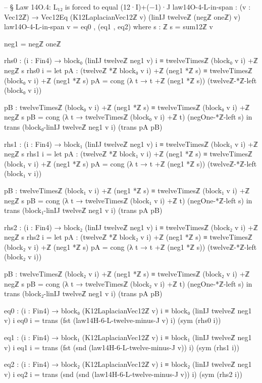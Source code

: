 \documentclass[11pt,a4paper]{book}
\begin{document}
\begin{code}
-- § Law 14O.4: L₁₂ is forced to equal (12·I)+(−1)·J
law14O-4-L-in-span : (v : Vec12ℤ) → Vec12Eq (K12LaplacianVec12ℤ v) (linIJ twelveℤ (negℤ oneℤ) v)
law14O-4-L-in-span v = eq0 , (eq1 , eq2)
  where
    s : ℤ
    s = sum12ℤ v

    neg1 = negℤ oneℤ

    rhs0 : (i : Fin4) →
      block₀ (linIJ twelveℤ neg1 v) i ≡ twelveTimesℤ (block₀ v i) +ℤ negℤ s
    rhs0 i =
      let
        pA : (twelveℤ *ℤ block₀ v i) +ℤ (neg1 *ℤ s) ≡ twelveTimesℤ (block₀ v i) +ℤ (neg1 *ℤ s)
        pA = cong (λ t → t +ℤ (neg1 *ℤ s)) (twelveℤ-*ℤ-left (block₀ v i))

        pB : twelveTimesℤ (block₀ v i) +ℤ (neg1 *ℤ s) ≡ twelveTimesℤ (block₀ v i) +ℤ negℤ s
        pB = cong (λ t → twelveTimesℤ (block₀ v i) +ℤ t) (negOne-*ℤ-left s)
      in
      trans
        (block₀-linIJ twelveℤ neg1 v i)
        (trans pA pB)

    rhs1 : (i : Fin4) →
      block₁ (linIJ twelveℤ neg1 v) i ≡ twelveTimesℤ (block₁ v i) +ℤ negℤ s
    rhs1 i =
      let
        pA : (twelveℤ *ℤ block₁ v i) +ℤ (neg1 *ℤ s) ≡ twelveTimesℤ (block₁ v i) +ℤ (neg1 *ℤ s)
        pA = cong (λ t → t +ℤ (neg1 *ℤ s)) (twelveℤ-*ℤ-left (block₁ v i))

        pB : twelveTimesℤ (block₁ v i) +ℤ (neg1 *ℤ s) ≡ twelveTimesℤ (block₁ v i) +ℤ negℤ s
        pB = cong (λ t → twelveTimesℤ (block₁ v i) +ℤ t) (negOne-*ℤ-left s)
      in
      trans
        (block₁-linIJ twelveℤ neg1 v i)
        (trans pA pB)

    rhs2 : (i : Fin4) →
      block₂ (linIJ twelveℤ neg1 v) i ≡ twelveTimesℤ (block₂ v i) +ℤ negℤ s
    rhs2 i =
      let
        pA : (twelveℤ *ℤ block₂ v i) +ℤ (neg1 *ℤ s) ≡ twelveTimesℤ (block₂ v i) +ℤ (neg1 *ℤ s)
        pA = cong (λ t → t +ℤ (neg1 *ℤ s)) (twelveℤ-*ℤ-left (block₂ v i))

        pB : twelveTimesℤ (block₂ v i) +ℤ (neg1 *ℤ s) ≡ twelveTimesℤ (block₂ v i) +ℤ negℤ s
        pB = cong (λ t → twelveTimesℤ (block₂ v i) +ℤ t) (negOne-*ℤ-left s)
      in
      trans
        (block₂-linIJ twelveℤ neg1 v i)
        (trans pA pB)

    eq0 : (i : Fin4) → block₀ (K12LaplacianVec12ℤ v) i ≡ block₀ (linIJ twelveℤ neg1 v) i
    eq0 i = trans (fst (law14H-6-L-twelve-minus-J v) i) (sym (rhs0 i))

    eq1 : (i : Fin4) → block₁ (K12LaplacianVec12ℤ v) i ≡ block₁ (linIJ twelveℤ neg1 v) i
    eq1 i = trans (fst (snd (law14H-6-L-twelve-minus-J v)) i) (sym (rhs1 i))

    eq2 : (i : Fin4) → block₂ (K12LaplacianVec12ℤ v) i ≡ block₂ (linIJ twelveℤ neg1 v) i
    eq2 i = trans (snd (snd (law14H-6-L-twelve-minus-J v)) i) (sym (rhs2 i))
\end{code}
\end{document}
